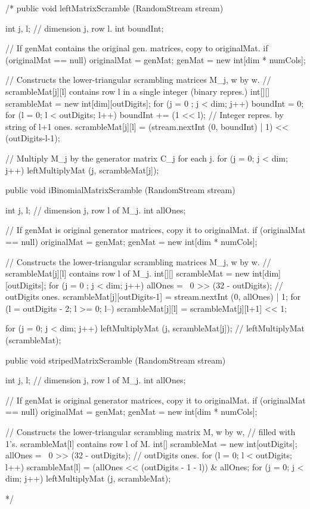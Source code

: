 \begin{code}
\begin{hide}
/*
   public void leftMatrixScramble (RandomStream stream) {
      int j, l;  // dimension j, row l.
      int boundInt;

      // If genMat contains the original gen. matrices, copy to originalMat.
      if (originalMat == null) {
         originalMat = genMat;
         genMat = new int[dim * numCols];
      }

      // Constructs the lower-triangular scrambling matrices M_j, w by w.
      // scrambleMat[j][l] contains row l in a single integer (binary repres.)
      int[][] scrambleMat = new int[dim][outDigits];
      for (j = 0 ; j < dim; j++) {
         boundInt = 0;
         for (l = 0; l < outDigits; l++) {
            boundInt += (1 << l); // Integer repres. by string of l+1 ones.
            scrambleMat[j][l] = (stream.nextInt (0, boundInt) | 1)
                                << (outDigits-l-1);
         }
      }

      // Multiply M_j by the generator matrix C_j for each j.
      for (j = 0; j < dim; j++) leftMultiplyMat (j, scrambleMat[j]);
   }

   public void iBinomialMatrixScramble (RandomStream stream) {
      int j, l;  // dimension j, row l of M_j.
      int allOnes;

      // If genMat is original generator matrices, copy it to originalMat.
      if (originalMat == null) {
         originalMat = genMat;
         genMat = new int[dim * numCols];
      }

      // Constructs the lower-triangular scrambling matrices M_j, w by w.
      // scrambleMat[j][l] contains row l of M_j.
      int[][] scrambleMat = new int[dim][outDigits];
      for (j = 0 ; j < dim; j++) {
         allOnes = ~0 >> (32 - outDigits);    // outDigits ones.
         scrambleMat[j][outDigits-1] = stream.nextInt (0, allOnes) | 1;
         for (l = outDigits - 2; l >= 0; l--)
            scrambleMat[j][l] = scrambleMat[j][l+1] << 1;
         }

      for (j = 0; j < dim; j++) leftMultiplyMat (j, scrambleMat[j]);
      // leftMultiplyMat (scrambleMat);
   }

   public void stripedMatrixScramble (RandomStream stream) {
      int j, l;  // dimension j, row l of M_j.
      int allOnes;

      // If genMat is original generator matrices, copy it to originalMat.
      if (originalMat == null) {
         originalMat = genMat;
         genMat = new int[dim * numCols];
      }

      // Constructs the lower-triangular scrambling matrix M, w by w,
      // filled with 1's.  scrambleMat[l] contains row l of M.
      int[] scrambleMat = new int[outDigits];
      allOnes = ~0 >> (32 - outDigits);    // outDigits ones.
      for (l = 0; l < outDigits; l++)
         scrambleMat[l] = (allOnes << (outDigits - 1 - l)) & allOnes;
      for (j = 0; j < dim; j++) leftMultiplyMat (j, scrambleMat);
   }
*/


\end{hide}
\end{code}
